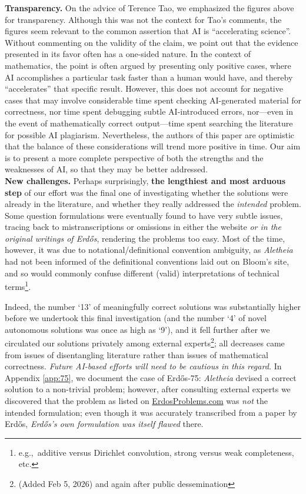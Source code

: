 \documentclass{article}
\theoremstyle{plain}
\theoremstyle{definition}
\newcommand{\Aletheia}{\emph{Aletheia}}
\begin{document}
\textbf{Transparency.} On the advice of Terence Tao, we emphasized the figures above for transparency. Although this was not the context for Tao's comments, the figures seem relevant to the common assertion that AI is ``accelerating science''. Without commenting on the validity of the claim, we point out that the evidence presented in its favor often has a one-sided nature. In the context of mathematics, the point is often argued by presenting only positive cases, where AI accomplishes a particular task faster than a human would have, and thereby ``accelerates'' that specific result. However, this does not account for negative cases that may involve considerable time spent checking AI-generated material for correctness, nor time spent debugging subtle AI-introduced errors, nor---even in the event of mathematically correct output---time spent searching the literature for possible AI plagiarism. Nevertheless, the authors of this paper are optimistic that the balance of these considerations will trend more positive in time. Our aim is to present a more complete perspective of both the strengths and the weaknesses of AI, so that they may be better addressed. \\


\textbf{New challenges.} Perhaps surprisingly, \textbf{the lengthiest and most arduous step} of our effort was the final one of investigating whether the solutions were already in the literature, and whether they really addressed the \emph{intended} problem. Some question formulations were eventually found to have very subtle issues, tracing back to mistranscriptions or omissions in either the website \emph{or in the original writings of Erd\H{o}s}, rendering the problems too easy. Most of the time, however, it was due to notational/definitional convention ambiguity, as {\Aletheia} had not been informed of the definitional conventions laid out on Bloom's site, and so would commonly confuse different (valid) interpretations of technical terms\footnote{e.g.,~additive versus Dirichlet convolution, strong versus weak completeness, etc.}.

Indeed, the number `13' of meaningfully correct solutions was substantially higher before we undertook this final investigation (and the number `4' of novel autonomous solutions was once as high as `9'), and it fell further after we circulated our solutions privately among external experts\footnote{(Added Feb 5, 2026) and again after public dessemination}; all decreases came from issues of disentangling literature rather than issues of mathematical correctness. \emph{Future AI-based efforts will need to be cautious in this regard.} In Appendix \ref{app:75}, we document the case of Erd\H{o}s-75: {\Aletheia} devised a correct solution to a non-trivial problem; however, after consulting external experts we discovered that the problem as listed on \href{https://www.erdosproblems.com/}{\ttfamily ErdosProblems.com} was \emph{not} the intended formulation; even though it was accurately transcribed from a paper \cite{Erd95} by Erd\H{o}s, \emph{Erd\H{o}s's own formulation was itself flawed} there. \\
\end{document}
